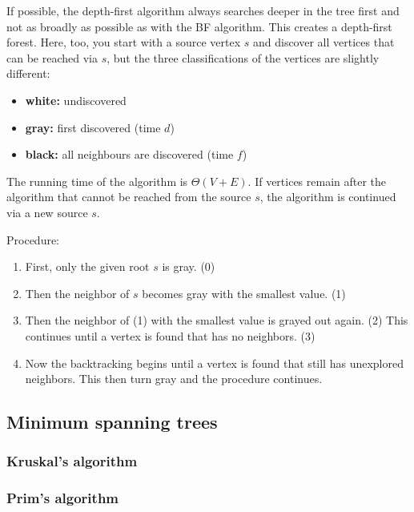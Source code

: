 If possible, the depth-first algorithm always searches deeper in the tree first and not as broadly as possible as with the BF algorithm. This creates a depth-first forest. Here, too, you start with a source vertex $s$ and discover all vertices that can be reached via $s$, but the three classifications of the vertices are slightly different:

\begin{itemize}
    \item \textbf{white:} undiscovered
    \item \textbf{gray:} first discovered (time $d$)
    \item \textbf{black:} all neighbours are discovered (time $f$)
\end{itemize}

The running time of the algorithm is $\Theta(V+E)$. If vertices remain after the algorithm that cannot be reached from the source $s$, the algorithm is continued via a new source $s$.

Procedure:
\begin{enumerate}
    \item First, only the given root $s$ is gray. (0)
    \item Then the neighbor of $s$ becomes gray with the smallest value. (1)
    \item Then the neighbor of (1) with the smallest value is grayed out again. (2) This continues until a vertex is found that has no neighbors. (3)
    \item Now the backtracking begins until a vertex is found that still has unexplored neighbors. This then turn gray and the procedure continues.
\end{enumerate}



\subsection{Minimum spanning trees}

\subsubsection{Kruskal's algorithm}

\subsubsection{Prim's algorithm}

